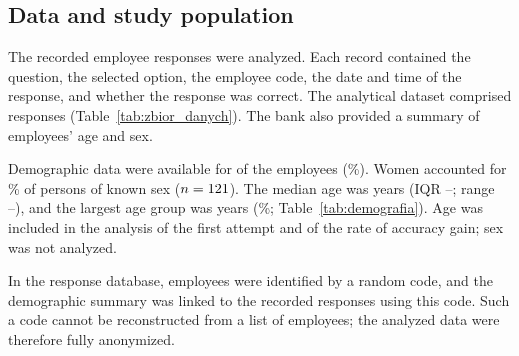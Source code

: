 \subsection{Data and study population}
\label{sec:dane}
The recorded employee responses were analyzed. Each record contained the question, the selected
option, the employee code, the date and time of the response, and whether the response was correct.
The analytical dataset comprised \NResponses{} responses
(Table~\ref{tab:zbior_danych}). The bank also provided a summary of employees' age and sex.

\begin{table}[H]
\centering
\caption{Characteristics of the dataset.}
\label{tab:zbior_danych}
\small
{}
\end{table}

Demographic data were available for \DemoMatched{} of the \DemoN{} employees (\DemoMatchedPct\%).
Women accounted for \DemoWomenPct\% of persons of known sex ($n = 121$). The median age was
\AgeMedian{} years (IQR \AgeQOne--\AgeQThree; range \AgeMin--\AgeMax), and the largest age group was
\AgeModalGroup{} years (\AgeModalGroupPct\%; Table~\ref{tab:demografia}). Age was included in the
analysis of the first attempt and of the rate of accuracy gain; sex was not analyzed.

\begin{table}[H]
\centering
\caption{Demographic characteristics of the employees included in the analysis.}
\label{tab:demografia}
\small
{}
\end{table}

In the response database, employees were identified by a random code, and the demographic summary was
linked to the recorded responses using this code. Such a code cannot be reconstructed from a list of
employees; the analyzed data were therefore fully anonymized.

